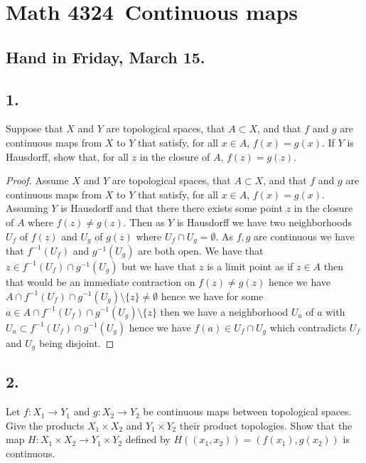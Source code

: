 \documentclass{amsart}
\theoremstyle{plain}
\theoremstyle{definition}
\theoremstyle{remark}
\begin{document}
\section*{Math 4324\  Continuous maps } 

\subsection*{Hand in Friday, March 15.}



\vspace{.15in}

\noindent
\subsection*{1.} Suppose that $X$ and $Y$ are topological spaces, that $A \subset X$, and that $f$ and $g$ are continuous maps from $X$ to $Y$ that satisfy, for all $x\in A$, $f(x) = g(x)$. If $Y$ is Hausdorff, show that, for all $z$ in the closure of $A$, $f(z) = g(z)$.

\begin{proof}
    Assume $X$ and $Y$ are topological spaces, that $A\subset X$, and that $f$ and $g$ are continuous maps from $X$ to $Y$ that satisfy, for all $x\in A$, $f(x)=g(x)$. Assuming $Y$ is Hausdorff and that there there exists some point $z$ in the closure of $A$ where $f(z)\not = g(z)$. Then as $Y$ is Hausdorff we have two neighborhoods $U_f$ of $f(z)$ and $U_g$ of $g(z)$ where $U_f\cap U_g=\emptyset$. As $f,g$ are continuous we have that $f^{-1}(U_f)$ and $g^{-1}(U_g)$ are both open. We have that $z\in f^{-1}(U_f)\cap g^{-1}(U_g)$ but we have that $z$ is a limit point as if $z\in A$ then that would be an immediate contraction on $f(z)\not = g(z)$ hence we have $A\cap f^{-1}(U_f)\cap g^{-1}(U_g)\setminus \{z\}\not = \emptyset $ hence we have for some $a\in A\cap f^{-1}(U_f)\cap g^{-1}(U_g)\setminus \{z\}$ then we have a neighborhood $U_{a}$ of $a$ with $U_{a}\subset f^{-1}(U_f)\cap g^{-1}(U_g)$ hence we have $f(a)\in U_f\cap U_g$ which contradicts $U_f$ and $U_g$ being disjoint. 
\end{proof}


\vspace{.15in}

\noindent
\subsection*{2.} Let $f : X_1 \rightarrow Y_1$ and $g : X_2 \rightarrow Y_2$ be continuous maps between topological spaces. Give the products $X_1 \times X_2$ and $Y_1 \times Y_2$ their product topologies. Show that the map $H : X_1 \times X_2 \rightarrow Y_1 \times Y_2$ defined by $H((x_1 , x_2 )) = (f(x_1) , g(x_2) )$ is continuous. 
\end{document}

